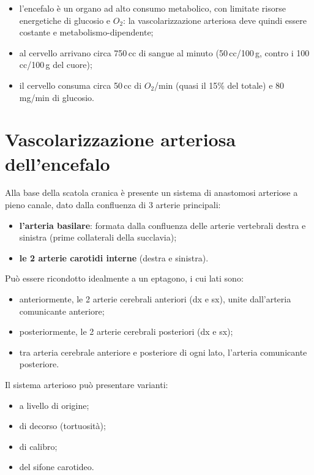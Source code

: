 \begin{itemize}
  \item l'encefalo è un organo ad alto consumo metabolico, con limitate risorse
    energetiche di glucosio e $O_2$: la vascolarizzazione arteriosa deve quindi
    essere costante e metabolismo-dipendente;
  \item al cervello arrivano circa 750\,cc di sangue al minuto (50\,cc/100\,g,
    contro i 100\,cc/100\,g del cuore);
  \item il cervello consuma circa 50\,cc di $O_2$/min (quasi il 15\% del totale)
    e 80\,mg/min di glucosio.
\end{itemize}

\section{Vascolarizzazione arteriosa dell'encefalo}

Alla base della scatola cranica è presente un sistema di anastomosi arteriose a
pieno canale, dato dalla confluenza di 3 arterie principali:
\begin{itemize}
  \item \textbf{l'arteria basilare}: formata dalla confluenza delle arterie
    vertebrali destra e sinistra (prime collaterali della succlavia);
  \item \textbf{le 2 arterie carotidi interne} (destra e sinistra).
\end{itemize}

Può essere ricondotto idealmente a un eptagono, i cui lati sono:
\begin{itemize}
  \item anteriormente, le 2 arterie cerebrali anteriori (dx e sx), unite
    dall'arteria comunicante anteriore;
  \item posteriormente, le 2 arterie cerebrali posteriori (dx e sx);
  \item tra arteria cerebrale anteriore e posteriore di ogni lato, l'arteria
    comunicante posteriore.
\end{itemize}

Il sistema arterioso può presentare varianti:
\begin{itemize}
  \item a livello di origine;
  \item di decorso (tortuosità);
  \item di calibro;
  \item del sifone carotideo.
\end{itemize}

